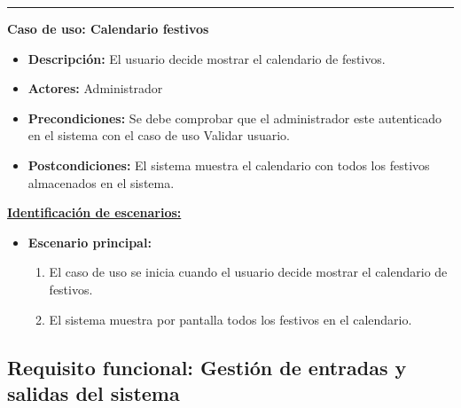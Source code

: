 \smallskip
\hrule height 1pt
\smallskip
\textbf{Caso de uso: Calendario festivos}
\begin{itemize}\renewcommand{\labelitemi}{$\cdot$}
 \item \textbf{Descripción:} El usuario decide mostrar el calendario de festivos.
  \item \textbf{Actores:} Administrador
  \item \textbf{Precondiciones:} Se debe comprobar que el administrador este autenticado en el sistema con el caso de uso Validar usuario.
  \item \textbf{Postcondiciones:} El sistema muestra el calendario con todos los festivos almacenados en el sistema.
\end{itemize}
\underline{\textbf{Identificación de escenarios:}}
\begin{itemize}\renewcommand{\labelitemi}{$\circ$}
 \item \textbf{Escenario principal:}
         \begin{enumerate}
          \item El caso de uso se inicia cuando el usuario decide mostrar el calendario de festivos.
	  \item El sistema muestra por pantalla todos los festivos en el calendario.
         \end{enumerate}
\end{itemize}

\subsection{Requisito funcional: Gestión de entradas y salidas del sistema}

